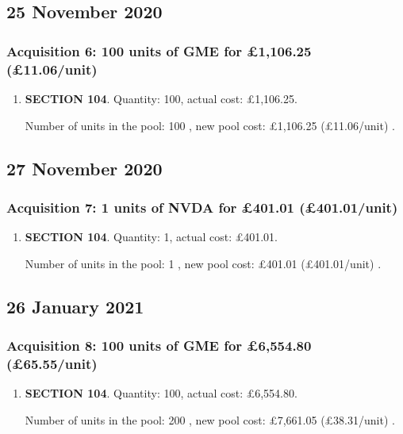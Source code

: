 \documentclass{article}
\begin{document}
\subsection*{25 November 2020}
\subsubsection*{
    Acquisition 6: 100 units of GME for £1,106.25
    (£11.06/unit)%
}

\begin{enumerate}
\item \textbf{SECTION 104}. Quantity: 100,
    actual cost: £1,106.25.

    Number of units in the pool:
    100%
,
    new pool cost: £1,106.25
    (£11.06/unit)%
.

\end{enumerate}



\subsection*{27 November 2020}
\subsubsection*{
    Acquisition 7: 1 units of NVDA for £401.01
    (£401.01/unit)%
}

\begin{enumerate}
\item \textbf{SECTION 104}. Quantity: 1,
    actual cost: £401.01.

    Number of units in the pool:
    1%
,
    new pool cost: £401.01
    (£401.01/unit)%
.

\end{enumerate}



\subsection*{26 January 2021}
\subsubsection*{
    Acquisition 8: 100 units of GME for £6,554.80
    (£65.55/unit)%
}

\begin{enumerate}
\item \textbf{SECTION 104}. Quantity: 100,
    actual cost: £6,554.80.

    Number of units in the pool:
    200%
,
    new pool cost: £7,661.05
    (£38.31/unit)%
.

\end{enumerate}
\end{document}
